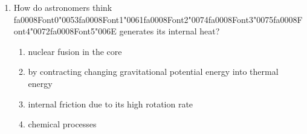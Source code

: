 \documentclass[12pt]{article}
\begin{document}
\begin{enumerate}[label=\arabic*.]
\begin{enumerate}[label=(\alph*)]
    \item Mass 5kg weight 50N
    \item Mass 5kg weight 25N
    \item Mass 10kg weight 100N
\end{enumerate}
\item How do astronomers think {\csname fa0008Font0\endcsname\char"0053}{\csname fa0008Font1\endcsname\char"0061}{\csname fa0008Font2\endcsname\char"0074}{\csname fa0008Font3\endcsname\char"0075}{\csname fa0008Font4\endcsname\char"0072}{\csname fa0008Font5\endcsname\char"006E} generates its internal heat?
\begin{enumerate}[label=(\alph*)]
    \item nuclear fusion in the core
    \item by contracting changing gravitational potential energy into thermal energy
    \item internal friction due to its high rotation rate
    \item chemical processes
\end{enumerate}
\end{enumerate}
\end{document}
